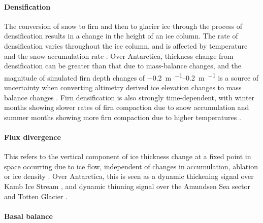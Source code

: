 

\paragraph{Densification}

The conversion of snow to firn and then to glacier ice through the process of densification results in a change in the height of an ice column.
The rate of densification varies throughout the ice column, and is affected by temperature and the snow accumulation rate \citep{HerronFirnDensificationEmpirical1980}.
Over Antarctica, thickness change from densification can be greater than that due to mass-balance changes, and the magnitude of simulated firn depth changes of \SIrange{-0.2}{0.2}{\metre\per\year} is a source of uncertainty when converting altimetry derived ice elevation changes to mass balance changes \citep{HelsenElevationChangesAntarctica2008}.
Firn densification is also strongly time-dependent, with winter months showing slower rates of firn compaction due to snow accumulation and summer months showing more firn compaction due to higher temperatures \citep{Ligtenbergimprovedsemiempiricalmodel2011}.

\paragraph{Flux divergence}

This refers to the vertical component of ice thickness change at a fixed point in space occurring due to ice flow, independent of changes in accumulation, ablation or ice density \citep[see][p.43]{CogleyGlossaryglaciermass2011}.
Over Antarctica, this is seen as a dynamic thickening signal over Kamb Ice Stream \citep{SmithRecentelevationchanges2005}, and dynamic thinning signal over the Amundsen Sea sector and Totten Glacier \citep{PritchardExtensivedynamicthinning2009,FlamentDynamicthinningAntarctic2012}. %

\paragraph{Basal balance}

